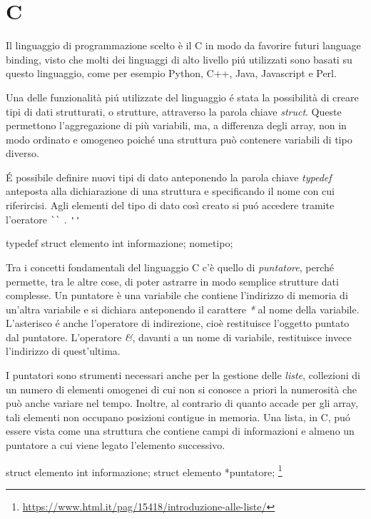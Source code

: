 \documentclass[12pt,italian]{report}
\begin{document}
\section{C}
\label{sec:c}

Il linguaggio di programmazione scelto è il C in modo da favorire futuri language binding, visto che molti dei linguaggi di alto livello piú utilizzati sono basati su questo linguaggio, come per esempio Python, C++, Java, Javascript e Perl.

Una delle funzionalit\`a piú utilizzate del linguaggio é stata la possibilit\`a di creare tipi di dati strutturati, o strutture, attraverso la parola chiave \textit{struct}. Queste permettono l’aggregazione di pi\`u variabili, ma, a differenza degli array, non in modo ordinato e omogeneo poich\'e una struttura può contenere variabili di tipo diverso.

\'{E} possibile definire nuovi tipi di dato anteponendo la parola chiave \textit{typedef} anteposta alla dichiarazione di una struttura e specificando il nome con cui riferircisi. 
Agli elementi del tipo di dato cos\`i creato si puó accedere tramite l'oeratore \verb|``| . \verb|''| 

\begin{center}
typedef struct elemento { int informazione; } nome\textunderscore tipo;
\end{center}

Tra i concetti fondamentali del linguaggio C  c'\`e quello di \textit{puntatore}, perché permette, tra le altre cose, di poter astrarre in modo semplice strutture dati complesse. Un puntatore \`e una variabile che contiene l'indirizzo di memoria di un'altra variabile e si dichiara anteponendo il carattere \textit{*} al nome della variabile. L'asterisco é anche l'operatore di indirezione, cio\`e restituisce l'oggetto puntato dal puntatore. L'operatore \textit{\&}, davanti a un nome di variabile, restituisce invece l'indirizzo di quest'ultima.

I puntatori sono strumenti necessari anche per la gestione delle \textit{liste}, collezioni di un numero di elementi omogenei di cui non si conosce a priori la numerosit\`a che pu\`o anche variare nel tempo. Inoltre, al contrario di quanto accade per gli array, tali elementi non occupano posizioni contigue in memoria.
Una lista, in C, pu\'o essere vista come una struttura che contiene campi di informazioni e almeno un puntatore a cui viene legato l'elemento successivo.

\begin{center}
struct elemento { int informazione; struct elemento *puntatore; } \footnote{\url{https://www.html.it/pag/15418/introduzione-alle-liste/}}
\end{center}
\end{document}
